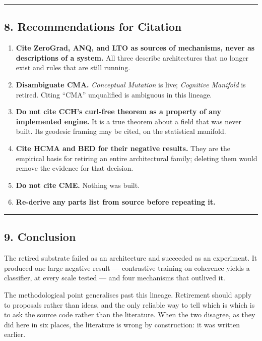 \documentclass[
  11pt,
  a4paper,
]{article}
\providecommand{\tightlist}{%
  \setlength{\itemsep}{0pt}\setlength{\parskip}{0pt}}
\begin{document}
\begin{center}\rule{0.5\linewidth}{0.5pt}\end{center}

\subsection{8. Recommendations for
Citation}\label{recommendations-for-citation}

\begin{enumerate}
\def\labelenumi{\arabic{enumi}.}
\tightlist
\item
  \textbf{Cite ZeroGrad, ANQ, and LTO as sources of mechanisms, never as
  descriptions of a system.} All three describe architectures that no
  longer exist and rules that are still running.
\item
  \textbf{Disambiguate CMA.} \emph{Conceptual Mutation} is live;
  \emph{Cognitive Manifold} is retired. Citing ``CMA'' unqualified is
  ambiguous in this lineage.
\item
  \textbf{Do not cite CCH's curl-free theorem as a property of any
  implemented engine.} It is a true theorem about a field that was never
  built. Its geodesic framing may be cited, on the statistical manifold.
\item
  \textbf{Cite HCMA and BED for their negative results.} They are the
  empirical basis for retiring an entire architectural family; deleting
  them would remove the evidence for that decision.
\item
  \textbf{Do not cite CME.} Nothing was built.
\item
  \textbf{Re-derive any parts list from source before repeating it.}
\end{enumerate}

\begin{center}\rule{0.5\linewidth}{0.5pt}\end{center}

\subsection{9. Conclusion}\label{conclusion}

The retired substrate failed as an architecture and succeeded as an
experiment. It produced one large negative result --- contrastive
training on coherence yields a classifier, at every scale tested --- and
four mechanisms that outlived it.

The methodological point generalises past this lineage. Retirement
should apply to proposals rather than ideas, and the only reliable way
to tell which is which is to ask the source code rather than the
literature. When the two disagree, as they did here in six places, the
literature is wrong by construction: it was written earlier.
\end{document}
